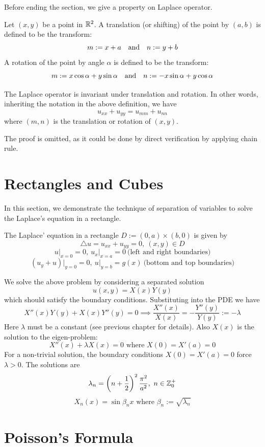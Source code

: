Before ending the section, we give a property on Laplace operator.

\medskip

\begin{defn} 
    Let $(x,y)$ be a point in ${\mathbb R}^2$. A translation (or shifting) of the point by $(a,b)$ is defined to be the transform:
    \[m := x+a \quad \text{and} \quad n:= y+b\]
    A rotation of the point by angle $\alpha$ is defined to be the transform:
    \[m:= x\cos \alpha + y\sin \alpha \quad \text{and} \quad n:= -x\sin\alpha + y\cos \alpha\]
\end{defn}

\begin{pro} 
    The Laplace operator is invariant under translation and rotation. In other words, inheriting the notation in the above definition, we have 
    \[u_{xx} + u_{yy} = u_{mm} + u_{nn}\]
    where $(m,n)$ is the translation or rotation of $(x,y)$. 
\end{pro}

The proof is omitted, as it could be done by direct verification by applying chain rule.

\section{Rectangles and Cubes}

In this section, we demonstrate the technique of separation of variables to solve the Laplace's equation in a rectangle. 

\medskip 

\begin{defn} 
    The Laplace' equation in a rectangle $D := (0,a) \times (b,0)$ is given by
    \[\triangle u = u_{xx} + u_{yy} = 0,\ (x,y)\in D\]
    \[u\vert_{x=0} = 0,\ u_x \vert_{x=a}=0\ \text{(left and right boundaries)}\]
    \[(u_y + u)\vert_{y=0} = 0,\ u\vert_{y=b} = g(x)\ \text{(bottom and top boundaries)}\]
\end{defn}

We solve the above problem by considering a separated solution 
\[u(x,y) = X(x)Y(y)\]
which should satisfy the boundary conditions. Substituting into the PDE we have 
\[X''(x)Y(y) + X(x)Y''(y) = 0 \implies \frac{X''(x)}{X(x)} = -\frac{Y''(y)}{Y(y)} := -\lambda\]
Here $\lambda$ must be a constant (see previous chapter for details). Also $X(x)$ is the solution to the eigen-problem:
\[X''(x) + \lambda X(x) = 0 \text{ where } X(0) = X'(a) = 0\]
For a non-trivial solution, the boundary conditions $X(0) = X'(a) = 0$ force $\lambda>0$. The solutions are 
\[\lambda_n = \left(n + \frac{1}{2}\right)^2 \frac{\pi^2}{a^2},\ n\in {\mathbb Z}^+_0\]
\[X_n(x) = \sin\beta_n x \text{ where } \beta_n := \sqrt{\lambda_n}\]

\section{Poisson's Formula}